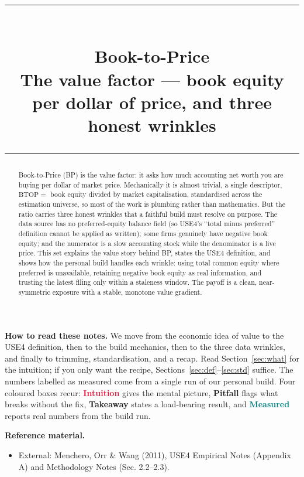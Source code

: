 \documentclass[11pt]{article}
\title{\vspace{-2.2em}
  {\color{steel}\rule{\textwidth}{1.3pt}}\\[0.7em]
  \Huge\bfseries Book-to-Price\\[0.35em]
  \large\mdseries The value factor --- book equity per dollar of price, and three honest wrinkles\\[0.4em]
  {\color{steel}\rule{\textwidth}{0.7pt}}}
\author{}
\date{}
\theoremstyle{definition}
\theoremstyle{plain}
\theoremstyle{remark}
\begin{document}
\maketitle
\thispagestyle{empty}

\begin{abstract}
Book-to-Price (BP) is the value factor: it asks how much accounting net worth you are buying per dollar of market price. Mechanically it is almost trivial, a single descriptor, $\mathrm{BTOP}=$ book equity divided by market capitalisation, standardised across the estimation universe, so most of the work is plumbing rather than mathematics. But the ratio carries three honest wrinkles that a faithful build must resolve on purpose. The data source has no preferred-equity balance field (so USE4's ``total minus preferred'' definition cannot be applied as written); some firms genuinely have negative book equity; and the numerator is a slow accounting stock while the denominator is a live price. This set explains the value story behind BP, states the USE4 definition, and shows how the personal build handles each wrinkle: using total common equity where preferred is unavailable, retaining negative book equity as real information, and trusting the latest filing only within a staleness window. The payoff is a clean, near-symmetric exposure with a stable, monotone value gradient.
\end{abstract}

\begin{tcolorbox}[colback=paperlt,colframe=ink!30,boxrule=0.4pt,arc=2pt,left=10pt,right=10pt,top=8pt,bottom=8pt]
\textbf{How to read these notes.} We move from the economic idea of value to the USE4 definition, then to the build mechanics, then to the three data wrinkles, and finally to trimming, standardisation, and a recap. Read Section~\ref{sec:what} for the intuition; if you only want the recipe, Sections~\ref{sec:def}--\ref{sec:std} suffice. The numbers labelled as measured come from a single run of our personal build. Four coloured boxes recur: \textcolor{crimson}{\textbf{Intuition}} gives the mental picture, \textcolor{amber}{\textbf{Pitfall}} flags what breaks without the fix, \textcolor{steel}{\textbf{Takeaway}} states a load-bearing result, and \textcolor{teal}{\textbf{Measured}} reports real numbers from the build run.

\medskip
\textbf{Reference material.}
\begin{itemize}[leftmargin=1.4em,nosep]
  \item External: Menchero, Orr \& Wang (2011), USE4 Empirical Notes (Appendix A) and Methodology Notes (Sec. 2.2--2.3).
\end{itemize}
\end{tcolorbox}
\end{document}
